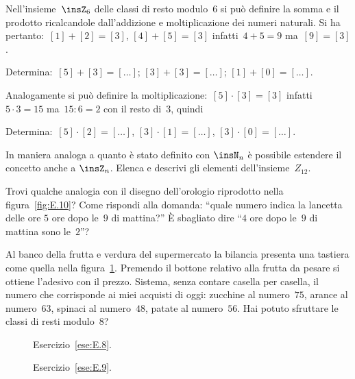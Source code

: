 \begin{esercizio}
\label{ese:E.7}
Nell'insieme~$\insZ_6$ delle classi di resto modulo~$6$ si può definire la somma e il prodotto ricalcandole dall'addizione e moltiplicazione
dei numeri naturali. Si ha pertanto:~$[1]+[2]=[3]$, $[4]+[5]=[3]$ infatti~$4+5=9$ ma~$[9]=[3]$.

Determina:~$[5]+[3]=[\ldots]$; $[3]+[3]=[\ldots]$; $[1]+[0]=[\ldots]$.

Analogamente si può definire la moltiplicazione:~$[5]\cdot [3]=[3]$
infatti~$5\cdot 3=15$ ma~$15:6=2$ con il resto di~$3$, quindi \dotfill

Determina:~$[5]\cdot [2]=[\ldots]$, $[3]\cdot [1]=[\ldots]$, $[3]\cdot [0]=[\ldots]$.
\end{esercizio}

\begin{esercizio}
\label{ese:E.8}
In maniera analoga a quanto è stato definito con $\insN_n$ è possibile estendere il concetto anche a $\insZ_n$. Elenca e descrivi gli elementi dell'insieme~$Z_{12}$.

Trovi qualche analogia con il disegno dell'orologio riprodotto nella figura~\ref{fig:E.10}?
Come rispondi alla domanda: ``quale numero indica la lancetta delle ore $5$ ore dopo le~$9$ di mattina?''
\`E sbagliato dire ``$4$ ore dopo le~$9$ di mattina sono le~$2$''?
\end{esercizio}

\begin{esercizio}
\label{ese:E.9}
Al banco della frutta e verdura del supermercato la bilancia presenta una tastiera come quella nella figura~\ref{fig:E.11}.
Premendo il bottone relativo alla frutta da pesare si ottiene l'adesivo con il prezzo.
Sistema, senza contare casella per casella, il numero che corrisponde ai miei acquisti di oggi:
zucchine al numero~$75$, arance al numero~$63$, spinaci al numero~$48$, patate al numero~$56$.
Hai potuto sfruttare le classi di resti modulo~$8$?
\end{esercizio}

\begin{figure}[hb]
 \begin{minipage}[t]{.45\textwidth}
 \centering
 \caption{Esercizio~\ref{ese:E.8}.}\label{fig:E.10}
 \end{minipage}\hfil
 \begin{minipage}[t]{.45\textwidth}
 \centering
 \caption{Esercizio~\ref{ese:E.9}.}\label{fig:E.11}
 \end{minipage}
\end{figure}


